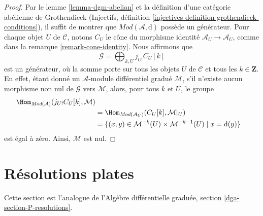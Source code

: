 \begin{proof}
Par le lemme \ref{lemma-dgm-abelian} et la définition d'une catégorie abélienne
de Grothendieck
(Injectifs, définition \ref{injectives-definition-grothendieck-conditions}), il
suffit de montrer
que $\textit{Mod}(\mathcal{A}, \text{d})$ possède
un générateur. Pour chaque objet $U$ de $\mathcal{C}$, notons
$C_U$ le cône du morphisme identité $\mathcal{A}_U \to \mathcal{A}_U$, comme
dans la remarque \ref{remark-cone-identity}. Nous affirmons
que $$
\mathcal{G} = \bigoplus\nolimits_{k, U} j_{U!}C_U[k]
$$
est un générateur, où la somme porte sur tous les objets $U$ de $\mathcal{C}$
et tous les $k \in \mathbf{Z}$. En
effet, étant donné un $\mathcal{A}$-module différentiel gradué $\mathcal{M}$,
s'il n'existe aucun morphisme non nul de $\mathcal{G}$ vers $\mathcal{M}$,
alors, pour tous $k$ et $U$,
le groupe \begin{align*}
\Hom_{\textit{Mod}(\mathcal{A})}(j_{U!}C_U[k], \mathcal{M}) \\
&
= \Hom_{\textit{Mod}(\mathcal{A}_U)}(C_U[k], \mathcal{M}|_U) \\
&
= \{(x, y) \in \mathcal{M}^{-k}(U) \times \mathcal{M}^{-k - 1}(U) \mid
x = \text{d}(y)\}
\end{align*}
est égal à zéro. Ainsi, $\mathcal{M}$ est nul.
\end{proof}











\section{Résolutions plates}
\label{section-P-resolutions}

\noindent
Cette section est l'analogue de
l'Algèbre différentielle graduée, section \ref{dga-section-P-resolutions}.

